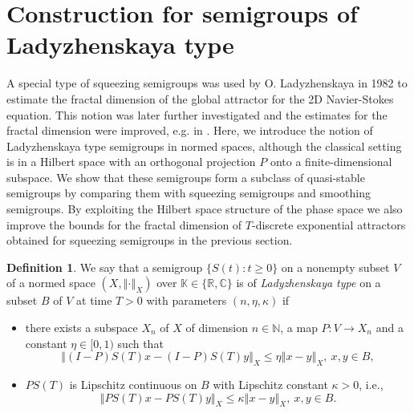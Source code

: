 \documentclass[a4paper,12pt,reqno]{amsart}
\theoremstyle{plain}
\theoremstyle{definition}
\newtheorem{defn}[lem]{Definition}
\numberwithin{equation}{section}
\newcommand{\N}{\mathbb{N}}
\newcommand{\R}{\mathbb{R}}
\newcommand{\C}{\mathbb{C}}
\newcommand{\K}{\mathbb{K}}
\newcommand{\norm}[1]{\left\Vert#1\right\Vert}
\renewcommand{\geq}{\geqslant}
\renewcommand{\leq}{\leqslant}
\begin{document}
\section{Construction for semigroups of Ladyzhenskaya type}\label{sec:Lad}

A special type of squeezing semigroups was used by O. Ladyzhenskaya \cite{Lad82b}
in 1982 to estimate the fractal dimension of the global attractor for the 2D Navier-Stokes equation. This notion was later further investigated and the estimates for the fractal dimension were improved, e.g. in \cite[Theorems 3 and 4]{BV99}. Here, we introduce the notion of Ladyzhenskaya type semigroups in normed spaces, although the classical setting is in a Hilbert space with an orthogonal projection $P$ onto a finite-dimensional subspace. We show that these semigroups form a subclass of quasi-stable semigroups by comparing them with squeezing semigroups and smoothing semigroups. By exploiting the Hilbert space structure of the phase space we also improve the bounds for the fractal dimension of $T$-discrete exponential attractors obtained for squeezing semigroups in the previous section.

\begin{defn}\label{defn:LADY}
We say that a semigroup $\{S(t)\colon t\geq0\}$ on a nonempty subset $V$ of a normed space $(X,\norm{\cdot}_{X})$ over $\K\in\{\R,\C\}$
is of \emph{Ladyzhenskaya type} on a subset $B$ of $V$ at time $T>0$ with parameters $(n,\eta,\kappa)$ if
\begin{itemize}
\item[(a)] there exists a subspace $X_n$ of $X$ of dimension $n\in\N$, a map $P\colon V\to X_n$ and
a constant $\eta\in[0,1)$ such that
\begin{equation}\label{e:LADY}
\norm{(I-P)S(T)x-(I-P)S(T)y}_{X}\leq\eta\norm{x-y}_{X},\ x,y\in B,
\end{equation} 
\item[(b)] $PS(T)$ is Lipschitz continuous on $B$ with Lipschitz constant $\kappa>0$, i.e., 
\begin{equation*}
\norm{PS(T)x-PS(T)y}_{X}\leq \kappa\norm{x-y}_{X},\ x,y\in B.
\end{equation*}
\end{itemize}
\end{defn}
\end{document}
